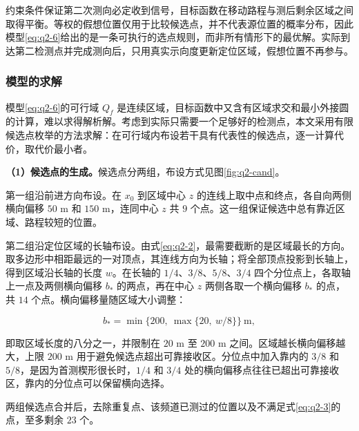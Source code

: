 约束条件保证第二次测向必定收到信号，目标函数在移动路程与测后剩余区域之间取得平衡。等权的假想位置仅用于比较候选点，并不代表源位置的概率分布，因此模型\eqref{eq:q2-6}给出的是一条可执行的选点规则，而非所有情形下的最优解。实际到达第二检测点并完成测向后，只用真实示向度更新定位区域，假想位置不再参与。

\subsubsection{模型的求解}\label{sec:q2-3}

模型\eqref{eq:q2-6}的可行域 $Q_f$ 是连续区域，目标函数中又含有区域求交和最小外接圆的计算，难以求得解析解。考虑到实际只需要一个足够好的检测点，本文采用有限候选点枚举的方法求解：在可行域内布设若干具有代表性的候选点，逐一计算代价，取代价最小者。

\textbf{（1）候选点的生成。}候选点分两组，布设方式见图\ref{fig:q2-cand}。

第一组沿前进方向布设。在 $x_0$ 到区域中心 $z$ 的连线上取中点和终点，各自向两侧横向偏移 $50$ m 和 $150$ m，连同中心 $z$ 共 $9$ 个点。这一组保证候选中总有靠近区域、路程较短的位置。

第二组沿定位区域的长轴布设。由式\eqref{eq:q2-2}，最需要截断的是区域最长的方向。取多边形中相距最远的一对顶点，其连线方向为长轴；将全部顶点投影到长轴上，得到区域沿长轴的长度 $w$。在长轴的 $1/4$、$3/8$、$5/8$、$3/4$ 四个分位点上，各取轴上一点及两侧横向偏移 $b_*$ 的两点，再在中心 $z$ 两侧各取一个横向偏移 $b_*$ 的点，共 $14$ 个点。横向偏移量随区域大小调整：

\begin{equation}\label{eq:q2-7}
b_*=\min\{200,\ \max\{20,\ w/8\}\}\ \text{m},
\end{equation}

即取区域长度的八分之一，并限制在 $20$ m 至 $200$ m 之间。区域越长横向偏移越大，上限 $200$ m 用于避免候选点超出可靠接收区。分位点中加入靠内的 $3/8$ 和 $5/8$，是因为首测楔形很长时，$1/4$ 和 $3/4$ 处的横向偏移点往往已超出可靠接收区，靠内的分位点可以保留横向选择。

两组候选点合并后，去除重复点、该频道已测过的位置以及不满足式\eqref{eq:q2-3}的点，至多剩余 $23$ 个。

\begin{center}
\begin{minipage}{\linewidth}
\centering
\QTwoCandidateFigure
{}
\label{fig:q2-cand}
\end{minipage}
\end{center}

